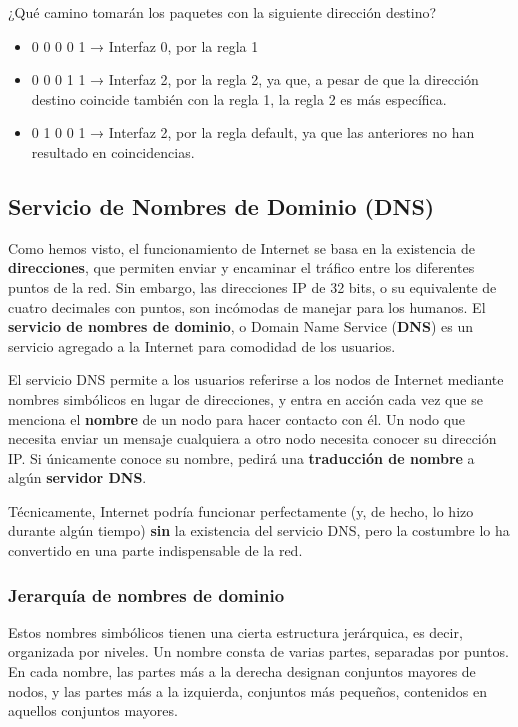 \documentclass[spanish,A4,]{article}
\begin{document}
¿Qué camino tomarán los paquetes con la siguiente dirección destino?

\begin{itemize}
\itemsep1pt\parskip0pt
\item
  0 0 0 0 1 → Interfaz 0, por la regla 1
\item
  0 0 0 1 1 → Interfaz 2, por la regla 2, ya que, a pesar de que la
  dirección destino coincide también con la regla 1, la regla 2 es más
  específica.
\item
  0 1 0 0 1 → Interfaz 2, por la regla default, ya que las anteriores no han
  resultado en coincidencias.
\end{itemize}

\subsection{Servicio de Nombres de Dominio
(DNS)}\label{servicio-de-nombres-de-dominio-dns}

Como hemos visto, el funcionamiento de Internet se basa en la existencia
de \textbf{direcciones}, que permiten enviar y encaminar el tráfico
entre los diferentes puntos de la red. Sin embargo, las direcciones IP
de 32 bits, o su equivalente de cuatro decimales con puntos, son
incómodas de manejar para los humanos. El \textbf{servicio de nombres de
dominio}, o Domain Name Service (\textbf{DNS}) es un servicio agregado a
la Internet para comodidad de los usuarios.

El servicio DNS permite a los usuarios referirse a los nodos de Internet
mediante nombres simbólicos en lugar de direcciones, y entra en acción
cada vez que se menciona el \textbf{nombre} de un nodo para hacer
contacto con él. Un nodo que necesita enviar un mensaje cualquiera a
otro nodo necesita conocer su dirección IP. Si únicamente conoce su
nombre, pedirá una \textbf{traducción de nombre} a algún
\textbf{servidor DNS}.

Técnicamente, Internet podría funcionar perfectamente (y, de hecho, lo
hizo durante algún tiempo) \textbf{sin} la existencia del servicio DNS,
pero la costumbre lo ha convertido en una parte indispensable de la red.

\subsubsection{Jerarquía de nombres de
dominio}\label{jerarquuxeda-de-nombres-de-dominio}

Estos nombres simbólicos tienen una cierta estructura jerárquica, es
decir, organizada por niveles. Un nombre consta de varias partes,
separadas por puntos. En cada nombre, las partes más a la derecha
designan conjuntos mayores de nodos, y las partes más a la izquierda,
conjuntos más pequeños, contenidos en aquellos conjuntos mayores.
\end{document}
